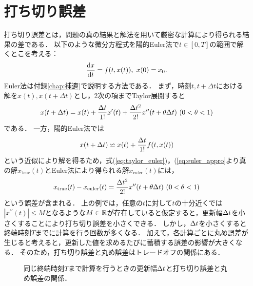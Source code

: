 \section{打ち切り誤差}
打ち切り誤差とは，問題の真の結果と解法を用いて厳密な計算により得られる結果の差である．
以下のような微分方程式を陽的Euler法で$t \in [0,T]$の範囲で解くとこを考える：
\begin{equation*}
    \frac{\mathrm{d}x}{\mathrm{d}t} = f(t,x(t)), \ x(0) = x_0.
\end{equation*}
Euler法は付録\ref{chap:補遺}で説明する方法である．
まず，時刻$t,t+\Delta t$における解を$x(t),x(t+\Delta t)$とし，2次の項までTaylor展開すると
\begin{align}
    \label{eq:taylor_euler}
    x(t + \Delta t) = x(t) + \frac{\Delta t}{1!}x^{\prime}(t) + \frac{\Delta t^2}{2!}x^{\prime\prime}(t + \theta\Delta t) \ (0 < \theta < 1)
\end{align}
である．
一方，陽的Euler法では
\begin{align}
    \label{eq:euler_appro}
    x(t + \Delta t) \backsimeq x(t) + \frac{\Delta t}{1!}f(t,x(t))
\end{align}
という近似により解を得るため，式(\ref{eq:taylor_euler})，(\ref{eq:euler_appro}より真の解$x_{\mathrm{true}}(t)$とEuler法により得られる解$x_{\mathrm{euler}}(t)$には，
\begin{align*}
    x_{\mathrm{true}}(t) - x_{\mathrm{euler}}(t) = \frac{\Delta t^2}{2!}x^{\prime\prime}(t + \theta\Delta t) \ (0 < \theta < 1)
\end{align*}
という誤差が含まれる．
上の例では，任意の$t$に対して$t$の十分近くでは$|x^{\prime\prime}(t)| \leq M$となるような$M \in \mathbb{R}$が存在していると仮定すると，更新幅$\Delta t$を小さくすることにより打ち切り誤差を小さくできる．
しかし，$\Delta t$を小さくすると終端時刻$T$までに計算を行う回数が多くなる．
加えて，各計算ごとに丸め誤差が生じると考えると，更新した値を求めるたびに蓄積する誤差の影響が大きくなる．
そのため，打ち切り誤差と丸め誤差はトレードオフの関係にある．
\begin{figure}[H]
    \centering
    \caption{同じ終端時刻$T$まで計算を行うときの更新幅$\Delta t$と打ち切り誤差と丸め誤差の関係．}
    \label{fig:error_tradingoff}
\end{figure}

